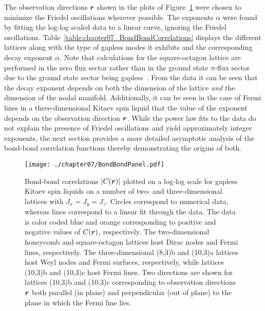 The observation directions $\bm{r}$ shown in the plots of Figure~\ref{fig:chapter07_6_3BondBondPanel} were chosen to minimize the Friedel oscillations wherever possible.
The exponents $\alpha$ were found by fitting the log-log scaled data to a linear curve, ignoring the Friedel oscillations.
Table~\ref{table:chapter07_BondBondCorrelations} displays the different lattices along with the type of gapless modes it exhibits and the corresponding decay exponent $\alpha$.
Note that calculations for the square-octagon lattice are performed in the zero flux sector rather than in the ground state $\pi$-flux sector due to the ground state sector being gapless~\cite{YangPRB2007}.
From the data it can be seen that the decay exponent depends on both the dimension of the lattice \textit{and} the dimension of the nodal manifold.
Additionally, it can be seen in the case of Fermi lines in a three-dimensional Kitaev spin liquid that the value of the exponent depends on the observation direction $\bm{r}$.
While the power law fits to the data do not explain the presence of Friedel oscillations and yield approximately integer exponents, the next section provides a more detailed asymptotic analysis of the bond-bond correlation functions thereby demonstrating the origins of both.
%
\begin{figure}[p]
	\centering
	\texttt{[image: ./chapter07/BondBondPanel.pdf]}
	\caption{
		Bond-bond correlations $\left| C(\bm{r}) \right|$ plotted on a log-log scale for gapless Kitaev spin liquids on a number of two- and three-dimensional lattices with $J_x = J_y = J_z$.
		Circles correspond to numerical data, whereas lines correspond to a linear fit through the data.
		The data is color coded blue and orange corresponding to positive and negative values of $C(\bm{r})$, respectively.
		The two-dimensional honeycomb and square-octagon lattices host Dirac nodes and Fermi lines, respectively.
		The three-dimensional (8,3)b and (10,3)a lattices host Weyl nodes and Fermi surfaces, respectively, while lattices (10,3)b and (10,3)c host Fermi lines.
		Two directions are shown for lattices (10,3)b and (10,3)c corresponding to observation directions $\bm{r}$ both parallel (in plane) and perpendicular (out of plane) to the plane in which the Fermi line lies.
	}
	\label{fig:chapter07_6_3BondBondPanel}
\end{figure}
%


%
%
